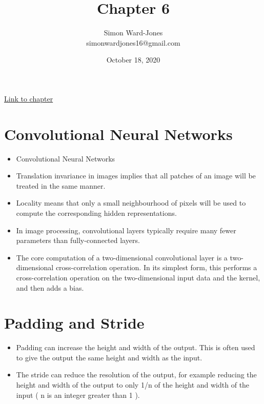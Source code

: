 \documentclass[12pt,notitlepage]{article}
\begin{document}


\title{\Large{\textbf{Chapter 6}}}
\date{October 18, 2020}
\author{Simon Ward-Jones\\simonwardjones16@gmail.com}

\maketitle
\href{https://d2l.ai/chapter_convolutional-neural-networks/index.html}{Link to chapter}

\section{Convolutional Neural Networks}
\begin{itemize}
    \item Convolutional Neural Networks
    \item Translation invariance in images implies that all patches of an image will be treated in the same manner.
    \item Locality means that only a small neighbourhood of pixels will be used to compute the corresponding hidden representations.
    \item In image processing, convolutional layers typically require many fewer parameters than fully-connected layers.
    \item The core computation of a two-dimensional convolutional layer is a two-dimensional cross-correlation operation. In its simplest form, this performs a cross-correlation operation on the two-dimensional input data and the kernel, and then adds a bias.
\end{itemize}

\section{Padding and Stride}
\begin{itemize}
    \item Padding can increase the height and width of the output. This is often used to give the output the same height and width as the input.
    \item The stride can reduce the resolution of the output, for example reducing the height and width of the output to only 1/n  of the height and width of the input ( n is an integer greater than  1 ).
\end{itemize}
\end{document}
